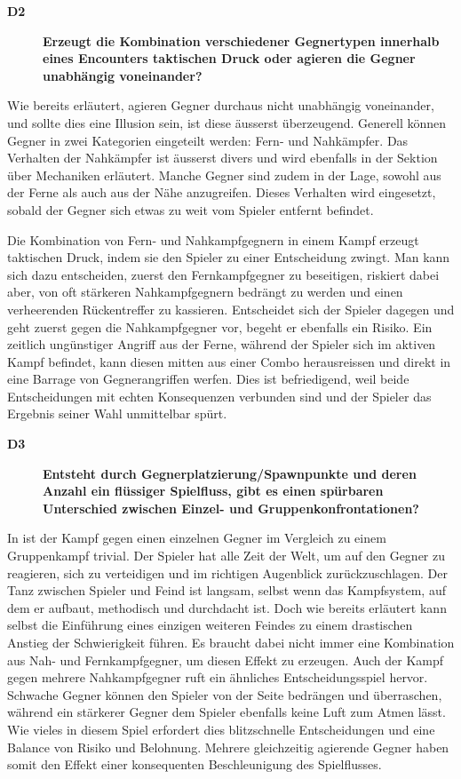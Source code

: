 \documentclass[../Main.tex]{subfiles}
\begin{document}
\begin{description}
  \item[\textbf{D2}] \textbf{Erzeugt die Kombination verschiedener Gegnertypen innerhalb eines Encounters taktischen Druck oder agieren die Gegner unabhängig voneinander?}
\end{description}

Wie bereits erläutert, agieren Gegner durchaus nicht unabhängig voneinander, und sollte dies eine Illusion sein, ist diese äusserst überzeugend. Generell können Gegner in zwei Kategorien eingeteilt werden: Fern- und Nahkämpfer. Das Verhalten der Nahkämpfer ist äusserst divers und wird ebenfalls in der Sektion über Mechaniken erläutert. Manche Gegner sind zudem in der Lage, sowohl aus der Ferne als auch aus der Nähe anzugreifen. Dieses Verhalten wird eingesetzt, sobald der Gegner sich etwas zu weit vom Spieler entfernt befindet.

Die Kombination von Fern- und Nahkampfgegnern in einem Kampf erzeugt taktischen Druck, indem sie den Spieler zu einer Entscheidung zwingt. Man kann sich dazu entscheiden, zuerst den Fernkampfgegner zu beseitigen, riskiert dabei aber, von oft stärkeren Nahkampfgegnern bedrängt zu werden und einen verheerenden Rückentreffer zu kassieren. Entscheidet sich der Spieler dagegen und geht zuerst gegen die Nahkampfgegner vor, begeht er ebenfalls ein Risiko. Ein zeitlich ungünstiger Angriff aus der Ferne, während der Spieler sich im aktiven Kampf befindet, kann diesen mitten aus einer Combo herausreissen und direkt in eine Barrage von Gegnerangriffen werfen. Dies ist befriedigend, weil beide Entscheidungen mit echten Konsequenzen verbunden sind und der Spieler das Ergebnis seiner Wahl unmittelbar spürt.

\begin{description}
  \item[\textbf{D3}] \textbf{Entsteht durch Gegnerplatzierung/Spawnpunkte und deren Anzahl ein flüssiger Spielfluss, gibt es einen spürbaren Unterschied zwischen Einzel- und Gruppenkonfrontationen?}
\end{description}

In  ist der Kampf gegen einen einzelnen Gegner im Vergleich zu einem Gruppenkampf trivial. Der Spieler hat alle Zeit der Welt, um auf den Gegner zu reagieren, sich zu verteidigen und im richtigen Augenblick zurückzuschlagen. Der Tanz zwischen Spieler und Feind ist langsam, selbst wenn das Kampfsystem, auf dem er aufbaut, methodisch und durchdacht ist. Doch wie bereits erläutert kann selbst die Einführung eines einzigen weiteren Feindes zu einem drastischen Anstieg der Schwierigkeit führen. Es braucht dabei nicht immer eine Kombination aus Nah- und Fernkampfgegner, um diesen Effekt zu erzeugen. Auch der Kampf gegen mehrere Nahkampfgegner ruft ein ähnliches Entscheidungsspiel hervor. Schwache Gegner können den Spieler von der Seite bedrängen und überraschen, während ein stärkerer Gegner dem Spieler ebenfalls keine Luft zum Atmen lässt. Wie vieles in diesem Spiel erfordert dies blitzschnelle Entscheidungen und eine Balance von Risiko und Belohnung. Mehrere gleichzeitig agierende Gegner haben somit den Effekt einer konsequenten Beschleunigung des Spielflusses.
\end{document}
